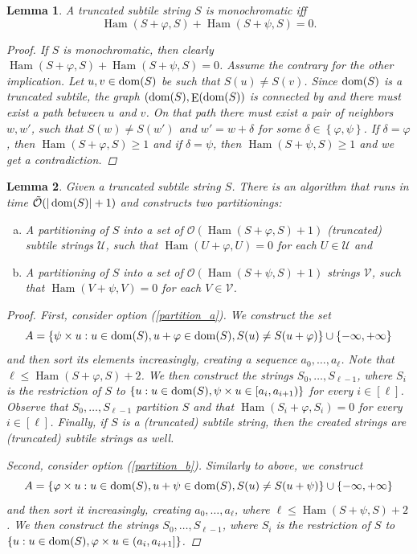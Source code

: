 \documentclass[11pt, letterpaper]{article}
\theoremstyle{plain}
\newtheorem{lemma}{Lemma}
\theoremstyle{definition}
\theoremstyle{remark}
\renewcommand{\O}{\mathcal{O}}
\newcommand{\tO}{\tilde{\mathcal{O}}}
\newcommand{\U}{\mathcal{U}}
\newcommand{\V}{\mathcal{V}}
\renewcommand{\phi}{\varphi}
\newcommand{\set}[1]{\left\lbrace #1 \right\rbrace}
\DeclareMathOperator*{\Edges}{E}
\DeclareMathOperator*{\Ham}{Ham}
\begin{document}
\begin{lemma}\label{monochromacy_condition}
	A truncated subtile string $S$ is monochromatic iff
	\[\Ham(S + \phi, S) + \Ham(S + \psi, S) = 0.\]
	\begin{proof}
		If $S$ is monochromatic, then clearly $\Ham(S + \phi, S) + \Ham(S + \psi, S) = 0$.
		Assume the contrary for the other implication.
		Let $u, v \in \operatorname*{dom}(S)$ be such that $S(u) \neq S(v)$.
		Since $\operatorname*{dom}(S)$ is a truncated subtile, the graph $(\d{S}, \Edges(\d{S})$ is connected by  and there must exist a path between $u$ and $v$.
		On that path there must exist a pair of neighbors $w, w'$, such that $S(w) \neq S(w')$ and $w' = w + \delta$ for some $\delta \in \set{\phi, \psi}$.
		If $\delta = \phi$, then $\Ham(S + \phi, S) \ge 1$ and if $\delta = \psi$, then $\Ham(S + \psi, S) \ge 1$ and we get a contradiction.
	\end{proof}
\end{lemma}


\begin{lemma}\label{cut_partitioning}
Given a truncated subtile string $S$. There is an algorithm that runs in time $\tO(|\d{S}| + 1)$ and constructs two partitionings:
	\begin{enumerate}[(a)]
		\item A partitioning of $S$ into a set of $\O(\Ham(S + \phi, S) + 1)$ (truncated) subtile strings $\U$, such that $\Ham(U + \phi, U) = 0$ for each $U \in \U$ and \label{partition_a}
		\item A partitioning of $S$ into a set of $\O(\Ham(S + \psi, S) + 1)$ strings $\V$, such that $\Ham(V + \psi, V) = 0$ for each $V \in \V$. \label{partition_b}
	\end{enumerate}
	\begin{proof}
		First, consider option (\ref{partition_a}). We construct the set
		\[ A = \set{\s{u} : u \in \d{S}, u + \phi \in \d{S}, S(u) \neq S(u + \phi)} \cup \set{-\infty, +\infty}\]
		and then sort its elements increasingly, creating a sequence $a_0, \dots, a_\ell$.
		Note that $\ell \le \Ham(S + \phi, S) + 2$.
		We then construct the strings $S_0, \dots, S_{\ell - 1}$, where $S_i$ is the restriction of $S$ to
		$\set{u : u \in \d{S}, \s{u} \in [a_i, a_{i + 1})}$ for every $i \in [\ell]$.
		Observe that $S_0, \dots, S_{\ell - 1}$ partition $S$ and that $\Ham(S_i + \phi, S_i) = 0$ for every $i \in [\ell]$. Finally, if $S$ is a (truncated) subtile string, then the created strings are (truncated) subtile strings as well.
	
		Second, consider option (\ref{partition_b}). Similarly to above, we construct
		\[ A = \set{\h{u} : u \in \d{S}, u + \psi \in \d{S}, S(u) \neq S(u + \psi)} \cup \set{-\infty, +\infty} \]
		and then sort it increasingly, creating $a_0, \dots, a_\ell$, where $\ell \le \Ham(S + \psi, S) + 2$.
		We then construct the strings $S_0, \dots, S_{\ell - 1}$, where $S_i$ is the restriction of $S$ to 
		$\set{u : u \in \d{S}, \h{u} \in (a_i, a_{i + 1}]}$.
	\end{proof}
\end{lemma}
\end{document}
